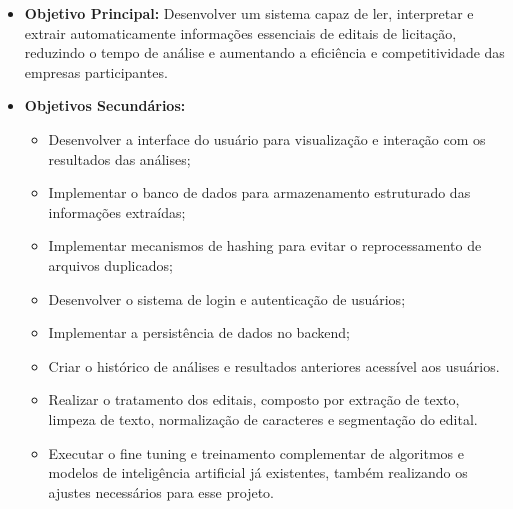 \begin{itemize}
    \item \textbf{Objetivo Principal:} 
    Desenvolver um sistema capaz de ler, interpretar e extrair automaticamente informações essenciais de editais de licitação, reduzindo o tempo de análise e aumentando a eficiência e competitividade das empresas participantes.

    \item \textbf{Objetivos Secundários:}
    \begin{itemize}
        \item Desenvolver a interface do usuário para visualização e interação com os resultados das análises;
        \item Implementar o banco de dados para armazenamento estruturado das informações extraídas;
        \item Implementar mecanismos de hashing para evitar o reprocessamento de arquivos duplicados;
        \item Desenvolver o sistema de login e autenticação de usuários;
        \item Implementar a persistência de dados no backend;
        \item Criar o histórico de análises e resultados anteriores acessível aos usuários.
        \item Realizar o tratamento dos editais, composto por extração de texto, limpeza de texto, normalização de caracteres e segmentação do edital.
        \item Executar o fine tuning e treinamento complementar de algoritmos e modelos de inteligência artificial já existentes, também realizando os ajustes necessários para esse projeto.
    \end{itemize}
\end{itemize}
